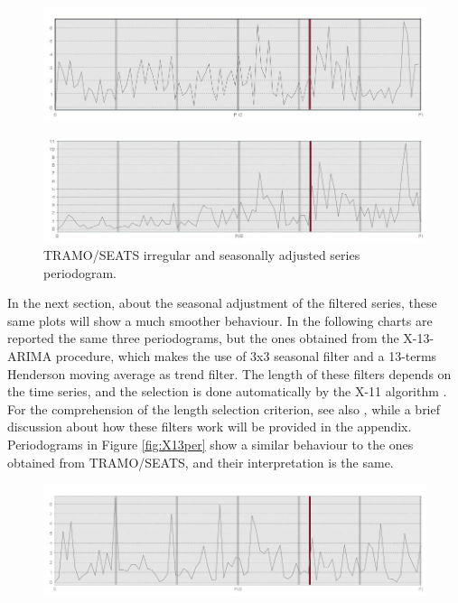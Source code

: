 \documentclass[english,blauw]{cbsdiscussionpaper}
\begin{document}
\begin{figure}[h]
\includegraphics[width=\linewidth]{../images/capitolo3/perIRR.jpg}
\end{figure}
\begin{figure}[h]
\includegraphics[width=\linewidth]{../images/capitolo3/perSA.jpg}
\caption{TRAMO/SEATS irregular and seasonally adjusted series periodogram.}
\label{fig:perIRRSA}
\end{figure}
In the next section, about the seasonal adjustment of the filtered series, these same plots will show a much smoother behaviour. In the following charts are reported the same three periodograms, but the ones obtained from the X-13-ARIMA procedure, which makes the use of 3x3 seasonal filter and a 13-terms Henderson moving average as trend filter. The length of these filters depends on the time series, and the selection is done automatically by the X-11 algorithm \citep{dageal1996}. For the comprehension of the length selection criterion, see also \citep{gru2015}, while a brief discussion about how these filters work will be provided in the appendix. Periodograms in Figure \ref{fig:X13per} show a similar behaviour to the ones obtained from TRAMO/SEATS, and their interpretation is the same. 
\begin{figure}[h]
\includegraphics[width=\linewidth]{../images/capitolo3/XperRES.jpg} 
\end{figure}
\end{document}
